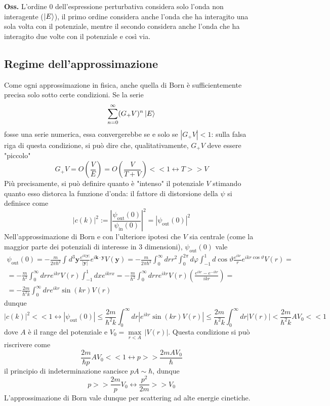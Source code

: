 \textbf{Oss.} L'ordine 0 dell'espressione perturbativa considera solo l'onda non interagente
($\ket{E}$), il primo ordine considera anche l'onda che ha interagito una sola volta con il
potenziale, mentre il secondo considera anche l'onda che ha interagito due volte con il potenziale
e così via.
\subsection{Regime dell'approssimazione}
Come ogni approssimazione in fisica, anche quella di Born è sufficientemente precisa solo sotto certe
condizioni. Se la serie
$$\sum_{n=0}^{\infty}(G_+V)^n\ket{E}$$ fosse una serie numerica, essa convergerebbe se e solo se
$|G_+V|<1$: sulla falsa riga di questa condizione, si può dire che, qualitativamente, $G_+V$ deve
essere "piccolo"
$$G_+V = O\left(\frac{V}{E}\right) = O\left(\frac{V}{T+V}\right)<<1 \leftrightarrow T>>V$$
Più precisamente, si può definire quanto è "intenso" il potenziale $V$ stimando quanto esso distorca la
funzione d'onda: il fattore di distorsione della $\psi$ si definisce come
$$|c(k)|^2:=\left|\frac{\psi_\text{out}(0)}{\psi_\text{in}(0)}\right|^2 =|\psi_\text{out}(0)|^2$$
Nell'approssimazione di Born e con l'ulteriore ipotesi che $V$ sia centrale (come la maggior parte
dei potenziali di interesse in 3 dimensioni), $\psi_\text{out}(0)$ vale
\begin{gather*}
\psi_\text{out}(0) = -\frac{m}{2\pi\hbar^2}\int_{}^{}d^3\mathbf{y} \frac{e^{ik|\mathbf{y}|}}
{|\mathbf{y}|}e^{i\mathbf{k}\cdot\mathbf{y}}V(\mathbf{y}) = -\frac{m}{2\pi\hbar^2}
\int_{0}^{\infty}drr^2\int_{0}^{2\pi}d\varphi\int_{-1}^{1}d\cos\vartheta \frac{e^{ikr}}{r}
e^{ikr\cos\vartheta}V(r)=\\
=-\frac{m}{\hbar^2}\int_{0}^{\infty}drre^{ikr}V(r)\int_{-1}^{1}dxe^{ikrx}=
-\frac{m}{\hbar^2}\int_{0}^{\infty}drre^{ikr}V(r)\left(\frac{e^{ikr}-e^{-ikr}}{ikr}\right)=\\=
-\frac{2m}{\hbar^2k}\int_{0}^{\infty}dr e^{ikr}\sin(kr)V(r)
\end{gather*}
dunque
$$|c(k)|^2<<1\leftrightarrow|\psi_\text{out}(0)|\leq\frac{2m}{\hbar^2k}\int_{0}^{\infty}dr
\left|e^{ikr}\sin(kr)V(r)\right|\leq\frac{2m}{\hbar^2k}\int_{0}^{\infty}dr|V(r)|<
\frac{2m}{\hbar^2k}AV_0<<1
$$
dove $A$ è il range del potenziale e $V_0 = \underset{r<A}\max\,|V(r)|$. Questa condizione si può
riscrivere come
$$\frac{2m}{\hbar p}AV_0<<1\leftrightarrow p>>\frac{2mAV_0}{\hbar}$$
il principio di indeterminazione sancisce $pA\sim\hbar$, dunque
$$p>>\frac{2m}{p}V_0\leftrightarrow \frac{p^2}{2m}>>V_0$$
L'approssimazione di Born vale dunque per scattering ad alte energie cinetiche.
